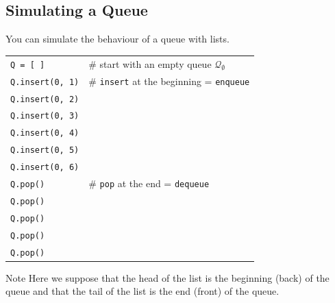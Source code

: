 \documentclass[t,handout,9pt]{beamer}
\begin{document}
\subsection{Simulating a Queue}
\begin{frame}
\vfill
You can simulate the behaviour of a queue with lists.
\vfill
\begin{table}[]
\begin{flushleft}
\begin{tabular}{ll}
\texttt{Q = [ ]} &  \# start with an empty queue $\mathcal{Q}_\emptyset$\\
\texttt{Q.insert(0, 1)} &  \# \texttt{insert} at the beginning = \texttt{enqueue}\\
\texttt{Q.insert(0, 2)} &  \\
\texttt{Q.insert(0, 3)} &  \\
\texttt{Q.insert(0, 4)} &  \\
\texttt{Q.insert(0, 5)} &  \\
\texttt{Q.insert(0, 6)} &  \\
\texttt{Q.pop()} &  \# \texttt{pop} at the end = \texttt{dequeue}\\
\texttt{Q.pop()} &  \\
\texttt{Q.pop()} &  \\
\texttt{Q.pop()} &  \\
\texttt{Q.pop()} &  \\
\end{tabular}
\end{flushleft}
\end{table}
\vfill
\begin{block}{Note}
Here we suppose that the head of the list is the beginning (back) of the queue and that the tail of the list is the end (front) of the queue.
\end{block}
\vfill
\end{frame}
%
\end{document}
